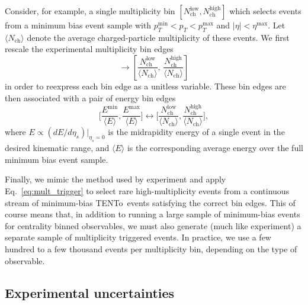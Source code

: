 \documentclass[aps,prc,reprint,amsmath,nofootinbib]{revtex4-1}
\newcommand{\trento}{T\raisebox{-0.5ex}{R}ENTo}
\newcommand{\nch}{N_\text{ch}}
\begin{document}
Consider, for example, a single multiplicity bin $[\nch^\text{low}, \nch^\text{high}]$ which selects events from a minimum bias event sample with $p_T^\text{min} < p_T < p_T^\text{max}$ and $|\eta| < \eta^\text{max}$.
Let $\langle\nch\rangle$ denote the average charged-particle multiplicity of these events.
We first rescale the experimental multiplicity bin edges
\begin{equation}
  [\nch^\text{low}, \nch^\text{high}] \rightarrow \left[\frac{\nch^\text{low}}{\langle \nch \rangle},\, \frac{\nch^\text{high}}{\langle \nch \rangle}\right ]
\end{equation}
in order to reexpress each bin edge as a unitless variable.
These bin edges are then associated with a pair of energy bin edges
\begin{equation}
  \label{eq:mult_trigger}
  \Bigg [\frac{E^\text{min}}{\langle E \rangle}, \frac{E^\text{max}}{\langle E \rangle} \Bigg ] \leftrightarrow \Bigg [\frac{\nch^\text{low}}{\langle \nch \rangle}, \frac{\nch^\text{high}}{\langle \nch \rangle} \Bigg ],
\end{equation}
where $E \propto (dE/d\eta_s) \vert_{\eta_s=0}$ is the midrapidity energy of a single event in the desired kinematic range, and $\langle E \rangle$ is the corresponding average energy over the full minimum bias event sample.

Finally, we mimic the method used by experiment and apply Eq.~\eqref{eq:mult_trigger} to select rare high-multiplicity events from a continuous stream of minimum-bias \trento\ events satisfying the correct bin edges.
This of course means that, in addition to running a large sample of minimum-bias events for centrality binned observables, we must also generate (much like experiment) a separate sample of multiplicity triggered events.
In practice, we use a few hundred to a few thousand events per multiplicity bin, depending on the type of observable.

\subsection{Experimental uncertainties}
\end{document}
